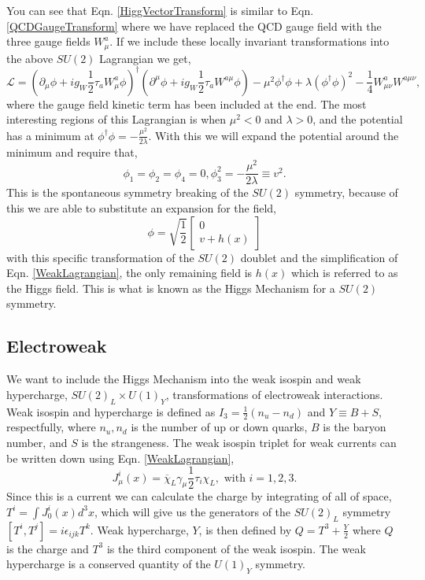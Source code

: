 You can see that Eqn. \ref{HiggVectorTransform} is similar to Eqn. \ref{QCDGaugeTransform} where we have replaced the QCD gauge field with the three gauge fields $W_\mu^a$. If we include these locally invariant transformations into the above $SU(2)$ Lagrangian we get,
\begin{equation}\label{WeakLagrangian}
\mathcal{L}=(\partial_\mu\phi+ig_W\frac{1}{2}\tau_{a}W^{a}_\mu\phi)^\dagger(\partial^\mu\phi+ig_W\frac{1}{2}\tau_{a}W^{a\mu}\phi)-\mu^2\phi^\dagger\phi+\lambda(\phi^\dagger\phi)^2-\frac{1}{4}W^{a}_{\mu\nu}W^{a\mu\nu},
\end{equation}
where the gauge field kinetic term has been included at the end. The most interesting regions of this Lagrangian is when $\mu^2<0$ and $\lambda>0$, and the potential has a minimum at $\phi^\dagger\phi=-\frac{\mu^2}{2\lambda}$. With this we will expand the potential around the minimum and require that,
\begin{equation}
\phi_1=\phi_2=\phi_4=0, \phi_3^2=-\frac{\mu^2}{2\lambda}\equiv v^2.
\end{equation}
This is the spontaneous symmetry breaking of the $SU(2)$ symmetry, because of this we are able to substitute an expansion for the field,
\begin{equation}
\phi=\sqrt{\frac{1}{2}}
\begin{bmatrix}
0 \\
v+h(x)
\end{bmatrix}
\end{equation}
with this specific transformation of the $SU(2)$ doublet and the simplification of Eqn. \ref{WeakLagrangian}, the only remaining field is $h(x)$ which is referred to as the Higgs field. This is what is known as the Higgs Mechanism for a $SU(2)$ symmetry. 

\subsection{Electroweak} \label{EMWeak}

We want to include the Higgs Mechanism into the weak isospin and weak hypercharge, $SU(2)_L\times U(1)_Y$, transformations of electroweak interactions. Weak isospin and hypercharge is defined as $I_3=\frac{1}{2}(n_u-n_d)$ and $Y\equiv B+S$, respectfully, where $n_u,n_d$ is the number of up or down quarks, $B$ is the baryon number, and $S$ is the strangeness. The weak isospin triplet for weak currents can be written down using Eqn. \ref{WeakLagrangian}, 
\begin{equation}\label{WeakIsospinCurrent}
J_\mu^i(x)=\overline{\chi}_L\gamma_\mu\frac{1}{2}\tau_i\chi_L, \text{ with } i=1,2,3.
\end{equation}
Since this is a current we can calculate the charge by integrating of all of space, $T^i=\int J_0^i(x)d^3x$, which will give us the generators of the $SU(2)_L$ symmetry $[T^i,T^j]=i\epsilon_{ijk}T^k$. Weak hypercharge, $Y$, is then defined by $Q=T^3+\frac{Y}{2}$ where $Q$ is the charge and $T^3$ is the third component of the weak isospin. The weak hypercharge is a conserved quantity of the $U(1)_Y$ symmetry. 

